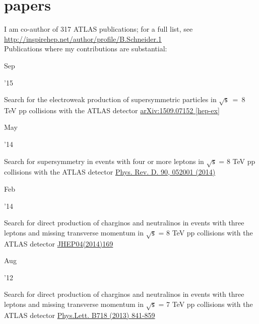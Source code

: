 \documentclass[]{cv} %
\begin{document}
\newpage

\section{papers}
\begin{entrylist}

  \entry
  {}
  {I am co-author of 317 ATLAS publications; for a full list, see \\
    \href{http://inspirehep.net/author/profile/B.Schneider.1}{http://inspirehep.net/author/profile/B.Schneider.1}\\
  Publications where my contributions are substantial:}
  {}
  {\vspace*{\spacingPubs}}

  \entry
  {\parbox[t]{\parboxWidthOne}{Sep}\parbox[t]{\parboxWidthTwo}{\hfill '15}}
  {Search for the electroweak production of supersymmetric particles in
    $\sqrt{\mathsf{s}}$~=~8 TeV pp collisions with the ATLAS detector} 
    {\href{http://arxiv.org/abs/1509.07152}{arXiv:1509.07152 [hep-ex]}}
  {\vspace*{\spacingPubs}}

  \entry
  {\parbox[t]{\parboxWidthOne}{May}\parbox[t]{\parboxWidthTwo}{\hfill '14}}
  {Search for supersymmetry in events with four or more leptons in $\sqrt{\mathsf{s}}$ = 8 TeV pp collisions with the ATLAS detector}
  {\href{http://link.aps.org/doi/10.1103/PhysRevD.90.052001}{Phys. Rev. D. 90, 052001 (2014)}}
  {\vspace*{\spacingPubs}}

  \entry
  {\parbox[t]{\parboxWidthOne}{Feb}\parbox[t]{\parboxWidthTwo}{\hfill '14}}
  {Search for direct production of charginos and neutralinos in events with three leptons and missing transverse momentum in $\sqrt{\mathsf{s}}$ =
8 TeV pp collisions with the ATLAS detector}
{\href{http://dx.doi.org/10.1007/JHEP04(2014)169}{JHEP04(2014)169}}
{\vspace*{\spacingPubs}}

    \entry
    {\parbox[t]{\parboxWidthOne}{Aug}\parbox[t]{\parboxWidthTwo}{\hfill '12}}
    {Search for direct production of charginos and neutralinos in events with three leptons and missing transverse momentum in $\sqrt{\mathsf{s}}$ =
  7 TeV pp collisions with the ATLAS detector}
  {\href{http://dx.doi.org/10.1016/j.physletb.2012.11.039}{Phys.Lett. B718 (2013) 841-859}}
  {\vspace*{\spacingPubs}}

\end{entrylist}
\end{document}
